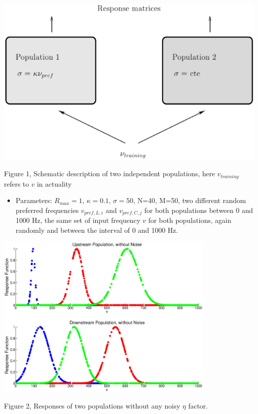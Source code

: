 \documentclass{article}
\begin{document}
\begin{center}
\includegraphics[width=\textwidth]{schema1.eps}
\begin{footnotesize}
 Figure 1, Schematic description of two independent populations, here $v_{training}$ refers to $v$ in actuality
\end{footnotesize}
\end{center}


\begin{itemize}
 \item Parameters: $R_{max}=1$, $\kappa=0.1$, $\sigma=50$, N=40, M=50, two different random preferred frequencies $v_{pref,L,i}$ and $v_{pref,C,j}$ for both populations between 0 and 1000 Hz, the same set of input frequency $v$ for both populations, again randomly and between the interval of 0 and 1000 Hz.
\end{itemize}

\begin{center}
\includegraphics[width=\textwidth, height=80mm]{f1.eps}
\begin{footnotesize}
 Figure 2, Responses of two populations without any noisy $\eta$ factor.
\end{footnotesize}
\end{center}
\end{document}

